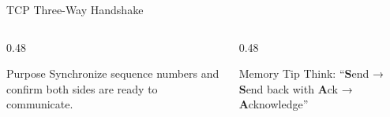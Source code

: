 \documentclass[aspectratio=169, 11pt]{beamer}
\begin{document}
\begin{frame}{TCP Three-Way Handshake}
    \vspace{0.3em}
    \begin{columns}[T]
        \begin{column}{0.48\textwidth}
            \begin{block}{Purpose}
                \small
                Synchronize sequence numbers and confirm both sides are ready to communicate.
            \end{block}
        \end{column}
        \begin{column}{0.48\textwidth}
            \begin{exampleblock}{Memory Tip}
                \small
                Think: ``\textbf{S}end → \textbf{S}end back with \textbf{A}ck → \textbf{A}cknowledge''
            \end{exampleblock}
        \end{column}
    \end{columns}
\end{frame}
\end{document}

